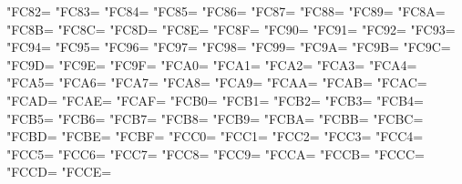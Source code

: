 \XeTeXcharclass"FC82=\KclassArabU
\XeTeXcharclass"FC83=\KclassArabU
\XeTeXcharclass"FC84=\KclassArabU
\XeTeXcharclass"FC85=\KclassArabU
\XeTeXcharclass"FC86=\KclassArabU
\XeTeXcharclass"FC87=\KclassArabU
\XeTeXcharclass"FC88=\KclassArabU
\XeTeXcharclass"FC89=\KclassArabU
\XeTeXcharclass"FC8A=\KclassArabU
\XeTeXcharclass"FC8B=\KclassArabU
\XeTeXcharclass"FC8C=\KclassArabU
\XeTeXcharclass"FC8D=\KclassArabU
\XeTeXcharclass"FC8E=\KclassArabU
\XeTeXcharclass"FC8F=\KclassArabU
\XeTeXcharclass"FC90=\KclassArabU
\XeTeXcharclass"FC91=\KclassArabU
\XeTeXcharclass"FC92=\KclassArabU
\XeTeXcharclass"FC93=\KclassArabU
\XeTeXcharclass"FC94=\KclassArabU
\XeTeXcharclass"FC95=\KclassArabU
\XeTeXcharclass"FC96=\KclassArabU
\XeTeXcharclass"FC97=\KclassArabU
\XeTeXcharclass"FC98=\KclassArabU
\XeTeXcharclass"FC99=\KclassArabU
\XeTeXcharclass"FC9A=\KclassArabU
\XeTeXcharclass"FC9B=\KclassArabU
\XeTeXcharclass"FC9C=\KclassArabU
\XeTeXcharclass"FC9D=\KclassArabU
\XeTeXcharclass"FC9E=\KclassArabU
\XeTeXcharclass"FC9F=\KclassArabU
\XeTeXcharclass"FCA0=\KclassArabU
\XeTeXcharclass"FCA1=\KclassArabU
\XeTeXcharclass"FCA2=\KclassArabU
\XeTeXcharclass"FCA3=\KclassArabU
\XeTeXcharclass"FCA4=\KclassArabU
\XeTeXcharclass"FCA5=\KclassArabU
\XeTeXcharclass"FCA6=\KclassArabU
\XeTeXcharclass"FCA7=\KclassArabU
\XeTeXcharclass"FCA8=\KclassArabU
\XeTeXcharclass"FCA9=\KclassArabU
\XeTeXcharclass"FCAA=\KclassArabU
\XeTeXcharclass"FCAB=\KclassArabU
\XeTeXcharclass"FCAC=\KclassArabU
\XeTeXcharclass"FCAD=\KclassArabU
\XeTeXcharclass"FCAE=\KclassArabU
\XeTeXcharclass"FCAF=\KclassArabU
\XeTeXcharclass"FCB0=\KclassArabU
\XeTeXcharclass"FCB1=\KclassArabU
\XeTeXcharclass"FCB2=\KclassArabU
\XeTeXcharclass"FCB3=\KclassArabU
\XeTeXcharclass"FCB4=\KclassArabU
\XeTeXcharclass"FCB5=\KclassArabU
\XeTeXcharclass"FCB6=\KclassArabU
\XeTeXcharclass"FCB7=\KclassArabU
\XeTeXcharclass"FCB8=\KclassArabU
\XeTeXcharclass"FCB9=\KclassArabU
\XeTeXcharclass"FCBA=\KclassArabU
\XeTeXcharclass"FCBB=\KclassArabU
\XeTeXcharclass"FCBC=\KclassArabU
\XeTeXcharclass"FCBD=\KclassArabU
\XeTeXcharclass"FCBE=\KclassArabU
\XeTeXcharclass"FCBF=\KclassArabU
\XeTeXcharclass"FCC0=\KclassArabU
\XeTeXcharclass"FCC1=\KclassArabU
\XeTeXcharclass"FCC2=\KclassArabU
\XeTeXcharclass"FCC3=\KclassArabU
\XeTeXcharclass"FCC4=\KclassArabU
\XeTeXcharclass"FCC5=\KclassArabU
\XeTeXcharclass"FCC6=\KclassArabU
\XeTeXcharclass"FCC7=\KclassArabU
\XeTeXcharclass"FCC8=\KclassArabU
\XeTeXcharclass"FCC9=\KclassArabU
\XeTeXcharclass"FCCA=\KclassArabU
\XeTeXcharclass"FCCB=\KclassArabU
\XeTeXcharclass"FCCC=\KclassArabU
\XeTeXcharclass"FCCD=\KclassArabU
\XeTeXcharclass"FCCE=\KclassArabU

